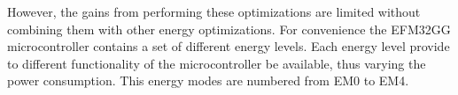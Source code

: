 However, the gains from performing these optimizations are limited without combining them with other energy optimizations.  For convenience the EFM32GG microcontroller contains a set of different energy levels. Each energy level provide to different functionality of the microcontroller be available, thus varying the power consumption. This energy modes are numbered from EM0 to EM4.        













